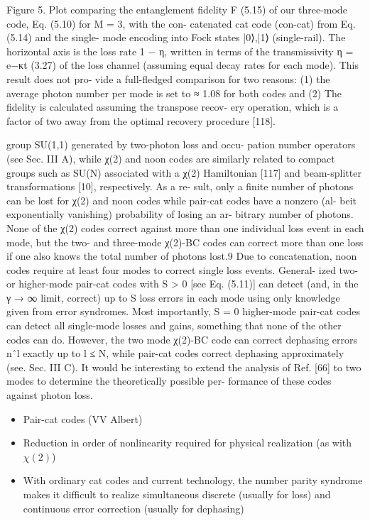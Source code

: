 \documentclass[12]{amsart}
\newcommand\0{\mathbf{0}}
\newcommand\<{\langle}
\renewcommand\>{\rangle}
\begin{document}
Figure 5. Plot comparing the entanglement fidelity F (5.15) of our three-mode code, Eq. (5.10) for M = 3, with the con- catenated cat code (con-cat) from Eq. (5.14) and the single- mode encoding into Fock states {|0⟩,|1⟩} (single-rail). The horizontal axis is the loss rate 1 − η, written in terms of the transmissivity η = e−κt (3.27) of the loss channel (assuming equal decay rates for each mode). This result does not pro- vide a full-fledged comparison for two reasons: (1) the average photon number per mode is set to ≈ 1.08 for both codes and (2) The fidelity is calculated assuming the transpose recov- ery operation, which is a factor of two away from the optimal recovery procedure [118].

group SU(1,1) generated by two-photon loss and occu- pation number operators (see Sec. III A), while χ(2) and noon codes are similarly related to compact groups such as SU(N) associated with a χ(2) Hamiltonian [117] and beam-splitter transformations [10], respectively. As a re- sult, only a finite number of photons can be lost for χ(2) and noon codes while pair-cat codes have a nonzero (al- beit exponentially vanishing) probability of losing an ar- bitrary number of photons. None of the χ(2) codes correct against more than one individual loss event in each mode, but the two- and three-mode χ(2)-BC codes can correct more than one loss if one also knows the total number of photons lost.9 Due to concatenation, noon codes require at least four modes to correct single loss events. General- ized two- or higher-mode pair-cat codes with S > 0 [see Eq. (5.11)] can detect (and, in the γ → ∞ limit, correct) up to S loss errors in each mode using only knowledge given from error syndromes. Most importantly, S = 0 higher-mode pair-cat codes can detect all single-mode losses and gains, something that none of the other codes can do. However, the two mode χ(2)-BC code can correct dephasing errors nˆl exactly up to l ≤ N, while pair-cat codes correct dephasing approximately (see. Sec. III C). It would be interesting to extend the analysis of Ref. [66] to two modes to determine the theoretically possible per- formance of these codes against photon loss.


\begin{itemize}
		\item Pair-cat codes (VV Albert)
		\item Reduction in order of nonlinearity required for physical realization (as with $\chi(2)$)
		\item With ordinary cat codes and current technology, the number parity syndrome makes it difficult to realize simultaneous discrete (usually for loss) and continuous error correction  (usually for dephasing)
	\end{itemize}
\end{document}
